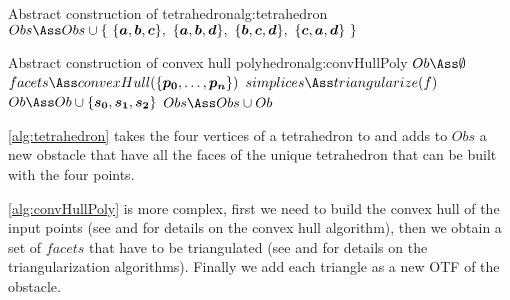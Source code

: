 \documentclass[dissertation.tex]{subfiles}
\begin{document}
\begin{algo}{Abstract construction of tetrahedron}{alg:tetrahedron}
  \State $Obs\Ass Obs\cup\{\ \{\ve{a},\ve{b},\ve{c}\},\ \{\ve{a},\ve{b},\ve{d}\},\ \{\ve{b},\ve{c},\ve{d}\},\ \{\ve{c},\ve{a},\ve{d}\}\ \}$
  \EndProcedure
\end{algo}
\begin{algo}{Abstract construction of convex hull
    polyhedron}{alg:convHullPoly}
  \State $Ob\Ass\emptyset$
  \State $facets\Ass convexHull(\{\ve{p_0},\dots,\ve{p_n}\})$
  \State $simplices\Ass triangularize(f)$
  \State $Ob\Ass Ob\cup\{\ve{s_0},\ve{s_1},\ve{s_2}\}$
  \EndFor
  \EndFor
  \State $Obs\Ass Obs\cup Ob$
  \EndProcedure
\end{algo}
\cref{alg:tetrahedron} takes the four vertices of a tetrahedron to
and adds to $Obs$ a new obstacle that have all the faces of the
unique tetrahedron that can be built with the four
points.

\cref{alg:convHullPoly} is more complex, first we need to build the
convex hull of the input points (see \cite{deberg} and \cite{press}
for details on the 
convex hull algorithm), then we obtain a set of $facets$ that have to
be triangulated (see \cite{deberg} and \cite{press} for details on the
triangularization
algorithms). Finally we add each triangle as a new \ac{OTF} of the
obstacle.
\end{document}
